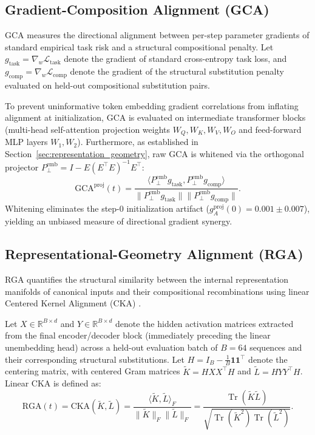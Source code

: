 \documentclass{article}
\theoremstyle{plain}
\theoremstyle{definition}
\DeclareMathOperator{\Tr}{Tr}
\begin{document}
\subsection{Gradient-Composition Alignment (GCA)}
GCA measures the directional alignment between per-step parameter gradients of standard empirical task risk and a structural compositional penalty. Let $g_{\text{task}} = \nabla_w \mathcal{L}_{\text{task}}$ denote the gradient of standard cross-entropy task loss, and $g_{\text{comp}} = \nabla_w \mathcal{L}_{\text{comp}}$ denote the gradient of the structural substitution penalty evaluated on held-out compositional substitution pairs.

To prevent uninformative token embedding gradient correlations from inflating alignment at initialization, GCA is evaluated on intermediate transformer blocks (multi-head self-attention projection weights $W_Q, W_K, W_V, W_O$ and feed-forward MLP layers $W_1, W_2$). Furthermore, as established in Section~\ref{sec:representation_geometry}, raw GCA is whitened via the orthogonal projector $P_{\perp}^{\text{emb}} = I - E (E^\top E)^{-1} E^\top$:
\begin{equation}
    \text{GCA}^{\text{proj}}(t) = \frac{\langle P_{\perp}^{\text{emb}} g_{\text{task}}, P_{\perp}^{\text{emb}} g_{\text{comp}} \rangle}{\| P_{\perp}^{\text{emb}} g_{\text{task}} \| \| P_{\perp}^{\text{emb}} g_{\text{comp}} \|}.
    \label{eq:app_whitened_gca}
\end{equation}
Whitening eliminates the step-0 initialization artifact ($g_A^{\text{proj}}(0) = 0.001 \pm 0.007$), yielding an unbiased measure of directional gradient synergy.

\subsection{Representational-Geometry Alignment (RGA)}
RGA quantifies the structural similarity between the internal representation manifolds of canonical inputs and their compositional recombinations using linear Centered Kernel Alignment (CKA) \citep{Kornblith2019Similarity}.

Let $X \in \mathbb{R}^{B \times d}$ and $Y \in \mathbb{R}^{B \times d}$ denote the hidden activation matrices extracted from the final encoder/decoder block (immediately preceding the linear unembedding head) across a held-out evaluation batch of $B=64$ sequences and their corresponding structural substitutions. Let $H = I_B - \frac{1}{B}\mathbf{1}\mathbf{1}^\top$ denote the centering matrix, with centered Gram matrices $\tilde{K} = H X X^\top H$ and $\tilde{L} = H Y Y^\top H$. Linear CKA is defined as:
\begin{equation}
    \text{RGA}(t) = \text{CKA}(\tilde{K}, \tilde{L}) = \frac{\langle \tilde{K}, \tilde{L} \rangle_F}{\| \tilde{K} \|_F \| \tilde{L} \|_F} = \frac{\Tr(\tilde{K} \tilde{L})}{\sqrt{\Tr(\tilde{K}^2) \Tr(\tilde{L}^2)}}.
    \label{eq:app_rga}
\end{equation}
\end{document}

